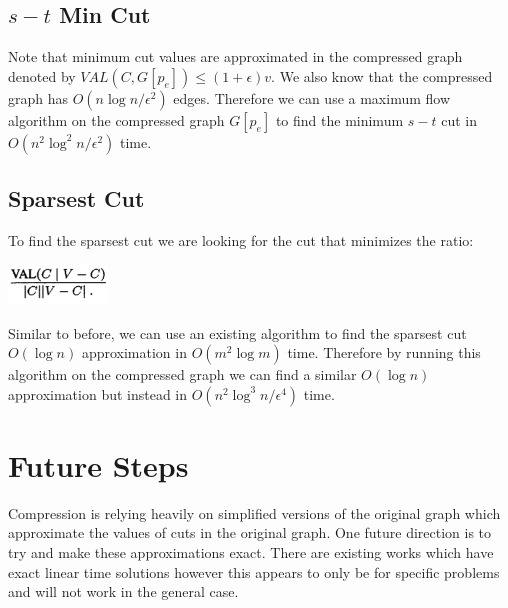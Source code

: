 \documentclass[11pt]{article}
\begin{document}
\subsection{$s-t$ Min Cut}

Note that minimum cut values are approximated in the compressed graph denoted by $VAL(C, G[p_e]) \le (1+\epsilon)v$. We also know that the compressed graph has $O(n\log n / \epsilon^2)$ edges. Therefore we can use a maximum flow algorithm \cite{GT88} on the compressed graph $G[p_e]$ to find the minimum $s-t$ cut in $O(n^2\log^2 n / \epsilon^2)$ time.

\subsection{Sparsest Cut}

To find the sparsest cut we are looking for the cut that minimizes the ratio: 

\begin{center}
\includegraphics[width=0.2\textwidth]{figures/SparsestCut.png}
\end{center}

Similar to before, we can use an existing algorithm \cite{KST90} to find the sparsest cut $O(\log n)$ approximation in $O(m^2 \log m)$ time. Therefore by running this algorithm on the compressed graph we can find a similar $O(\log n)$ approximation but instead in $O(n^2 \log^3 n / \epsilon^4)$ time.


\section{Future Steps}

Compression is relying heavily on simplified versions of the original graph which approximate the values of cuts in the original graph. One future direction is to try and make these approximations exact. There are existing works \cite{Kar96} which have exact linear time solutions however this appears to only be for specific problems and will not work in the general case.


\printbibliography
\end{document}

